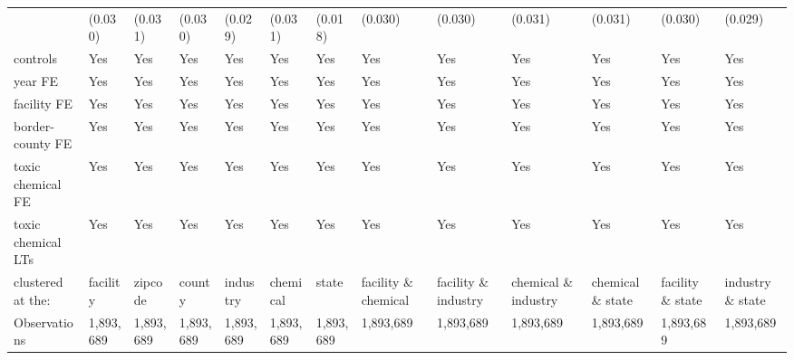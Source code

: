 \begin{table}[H]
{\begin{tabular}{@{}lllllllllllll@{}}
            & (0.030)   & (0.031)   & (0.030)   & (0.029)   & (0.031)   & (0.018)   & (0.030)              & (0.030)              & (0.031)              & (0.031)          & (0.030)          & (0.029)          \\
            controls                                   & Yes       & Yes       & Yes       & Yes       & Yes       & Yes       & Yes                  & Yes                  & Yes                  & Yes               & Yes               & Yes               \\
            year FE                                    & Yes       & Yes       & Yes       & Yes       & Yes       & Yes       & Yes                  & Yes                  & Yes                  & Yes               & Yes               & Yes               \\
            facility FE                                & Yes       & Yes       & Yes       & Yes       & Yes       & Yes       & Yes                  & Yes                  & Yes                  & Yes               & Yes               & Yes               \\
            border-county FE                           & Yes       & Yes       & Yes       & Yes       & Yes       & Yes       & Yes                  & Yes                  & Yes                  & Yes               & Yes               & Yes               \\
            toxic chemical FE                          & Yes       & Yes       & Yes       & Yes       & Yes       & Yes       & Yes                  & Yes                  & Yes                  & Yes               & Yes               & Yes               \\
            toxic chemical LTs                         & Yes       & Yes       & Yes       & Yes       & Yes       & Yes       & Yes                  & Yes                  & Yes                  & Yes               & Yes               & Yes               \\\midrule
            clustered at the:                          & facility  & zipcode   & county    & industry  & chemical  & state     & facility \& chemical & facility \& industry & chemical \& industry & chemical \& state & facility \& state & industry \& state \\
            Observations                               & 1,893,689 & 1,893,689 & 1,893,689 & 1,893,689 & 1,893,689 & 1,893,689 & 1,893,689            & 1,893,689            & 1,893,689            & 1,893,689         & 1,893,689         & 1,893,689         \\

\end{tabular}}
\end{table}

